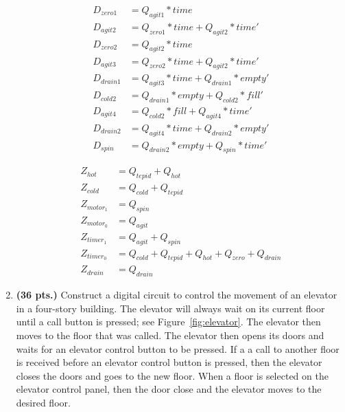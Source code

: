 \begin{enumerate}
\begin{onlysolution}
{\begin{align*}
                    D_{zero1}  &= Q_{agit1}*time \\
                    D_{agit2}  &= Q_{zero1}*time + Q_{agit2}*time' \\
                    D_{zero2}  &= Q_{agit2}*time \\
                    D_{agit3}  &= Q_{zero2}*time + Q_{agit2}*time' \\
                    D_{drain1} &= Q_{agit3}*time + Q_{drain1}*empty' \\
                    D_{cold2}  &= Q_{drain1}*empty + Q_{cold2}*fill' \\
                    D_{agit4}  &= Q_{cold2}*fill + Q_{agit4}*time' \\
                    D_{drain2} &= Q_{agit4}*time + Q_{drain2}*empty' \\
                    D_{spin}   &= Q_{drain2}*empty + Q_{spin}*time'
                \end{align*}

                {\color{blue}
                    \begin{align*}
                        Z_{hot    } &= Q_{tepid} + Q_{hot}\\
                        Z_{cold   } &= Q_{cold} + Q_{tepid}\\
                        Z_{motor_1} &= Q_{spin}\\
                        Z_{motor_0} &= Q_{agit}\\
                        Z_{timer_1} &= Q_{agit} + Q_{spin}\\
                        Z_{timer_0} &= Q_{cold} + Q_{tepid} + Q_{hot} + Q_{zero} + Q_{drain}\\
                        Z_{drain  } &= Q_{drain}
                \end{align*}}
            }
        \end{onlysolution}

    \item \textbf{ (36 pts.)}
        Construct a digital circuit to control the movement of an elevator in a
        four-story building.  The elevator will always wait on its current floor
        until a call button is pressed; see Figure~\ref{fig:elevator}.  The
        elevator then moves to the floor that was called.  The elevator then
        opens its doors and waits for an elevator control button to be pressed.
        If a a call to another floor is received before an elevator control
        button is pressed, then the elevator closes the doors and goes to the
        new floor.  When a floor is selected on the elevator control panel, then
        the door close and the elevator moves to the desired floor.


\end{enumerate}
